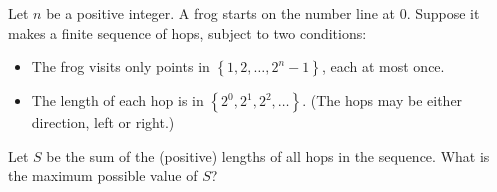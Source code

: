 Let $n$ be a positive integer. A frog starts on the number line at $0$. Suppose it makes a finite sequence of hops, subject to two conditions:
\begin{itemize}
	\item The frog visits only points in $\left\{1,2,\ldots,2^n-1\right\}$, each at most once.
	\item The length of each hop is in $\left\{2^0,2^1,2^2,\ldots\right\}$. (The hops may be either direction, left or right.)
\end{itemize}
Let $S$ be the sum of the (positive) lengths of all hops in the sequence. What is the maximum possible value of $S$?